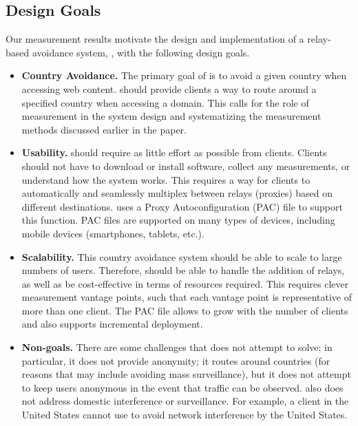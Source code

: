 \subsection{Design Goals}
\label{goals}

Our measurement results motivate 
 the design and implementation of a relay-based avoidance system,
\system{}, with the following design goals.

\begin{itemize}
\item {\bf Country Avoidance.}  The primary goal of \system{} is to
avoid a given country when accessing web content.  \system{} should
provide clients a way to route around a specified country when
accessing a domain.  This calls for the role of measurement in the
system design and systematizing the measurement methods discussed
earlier in the paper.

\item {\bf Usability.} \system{} should require as little effort as
possible from clients.  Clients should not have to download
or install software, collect any measurements, or understand how the
system works.  This requires a way for clients to automatically and
seamlessly multiplex between relays (proxies) based on different
destinations.  \system{} uses a Proxy Autoconfiguration (PAC) file to support this
function.  PAC files are supported on many types of devices, including mobile 
devices (smartphones, tablets, etc.).

\item {\bf Scalability.}  This country avoidance system should be able to scale to 
large numbers of users.  Therefore, \system{} should be able to handle the addition
 of relays, as well as be cost-effective in terms of resources required. This requires 
clever measurement vantage points, such that each vantage point is representative of 
more than one client.  The PAC file allows \system{} to 
grow with the number of clients and also supports incremental deployment.

\item {\bf Non-goals.}  There are some challenges that \system{} does not
attempt to  solve; in particular, it does not provide anonymity; it routes
around  countries (for reasons that may include avoiding mass surveillance),
but it does not attempt to keep users anonymous in the event that traffic can
be observed.   \system{} also does not address domestic interference or surveillance. For
example, a client in the United States cannot use \system{} to avoid network interference 
by the United States. 
\end{itemize}
